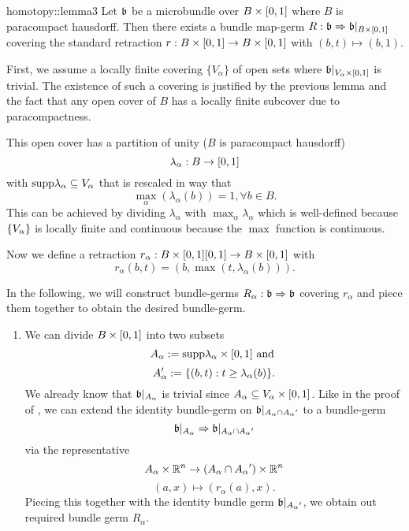 \begin{scope}
    \newcommand{\A} {
        A_\alpha{}
    }

    \begin{mylemma}{homotopy::lemma3}
        Let $\mathfrak{b}$ be a microbundle over $B \times{} [0, 1]$ where $B$ is paracompact hausdorff.
        Then there exists a bundle map-germ $R: \mathfrak{b} \Rightarrow{} \mathfrak{b}\vert_{B \times{} [0, 1]}$
        covering the standard retraction $r: B \times{} [0, 1] \to B \times{} [0, 1]$ with $(b, t) \mapsto (b, 1)$.
    \end{mylemma}

    \begin{myproof}
        First, we assume a locally finite covering $\{V_\alpha\}$ of open sets where $\mathfrak{b}\vert_{V_\alpha \times{} [0, 1]}$ is trivial.
        The existence of such a covering is justified by the previous lemma and
        the fact that any open cover of $B$ has a locally finite subcover due to paracompactness.

        This open cover has a partition of unity ($B$ is paracompact hausdorff) 
        \[ \lambda_\alpha: B \to [0, 1] \]
        with $\text{supp} \lambda_\alpha \subseteq{} V_\alpha$ that is rescaled in way that
        \[ \max_\alpha(\lambda_\alpha(b)) = 1, \forall b \in B. \]
        This can be achieved by dividing $\lambda_\alpha$ with $\max_\alpha \lambda_\alpha$
        which is well-defined because $\{V_\alpha\}$ is locally finite and continuous because the $\max$ function is continuous.
        
        Now we define a retraction $r_\alpha: B \times{} [0, 1] [0, 1] \to B \times{} [0, 1]$ with
        \[ r_\alpha(b, t) = (b, \max(t, \lambda_\alpha(b))). \]

        In the following, we will construct bundle-germs $R_\alpha: \mathfrak{b} \Rightarrow{} \mathfrak{b}$ covering $r_\alpha$
        and piece them together to obtain the desired bundle-germ.
        \begin{enumerate}
            \item 
            We can divide $B \times [0, 1]$ into two subsets
            \[ A_\alpha := \text{supp}{\lambda_\alpha} \times{} [0, 1] \text{ and } \]
            \[ A'_\alpha := \{(b, t):t \ge \lambda_\alpha(b)\}. \]
            We already know that $\mathfrak{b}\vert_{A_\alpha}$ is trivial since $A_\alpha \subseteq{} V_\alpha \times{} [0, 1]$.
            Like in the proof of , we can extend the identity bundle-germ on $\bb\restr{\A \cap \A'}$ to a bundle-germ
            \[ \germ{\bb\restr{\A}}{\bb\restr{\A \cap \A'}} \]
            via the representative
            \[ \A \times \R^n \to (\A \cap \A') \times \R^n\]
            \[ (a, x) \mapsto (r_\alpha(a), x). \]
            Piecing this together with the identity bundle germ $\bb\restr{\A'}$, we obtain out required bundle germ $R_\alpha$.
            

\end{enumerate}
\end{myproof}
\end{scope}
